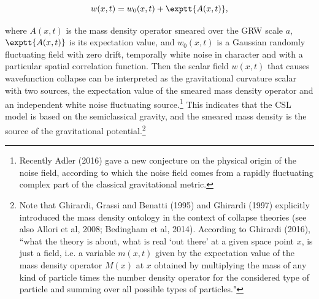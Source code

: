 \begin{equation}
w(x, t) = w_0(x, t) + \exptt{A(x, t)},
\label{}
\end{equation}

\noindent where $A(x, t)$ is the mass density operator smeared over the GRW scale $a$, $\exptt{A(x, t)}$ is its expectation value, and $w_0(x, t)$ is a Gaussian randomly fluctuating field with zero drift, temporally white noise in character and with a particular spatial correlation function. Then the scalar field $w(x, t)$ that causes wavefunction collapse can be interpreted as the gravitational curvature scalar with two sources, the expectation value of the smeared mass density operator and an independent white noise fluctuating source.\footnote{Recently Adler (2016) gave a new conjecture on the physical origin of the noise field, according to which the noise field comes from a rapidly fluctuating complex part of the classical gravitational metric.} This indicates that the CSL model is based on the semiclassical gravity, and the smeared mass density is the source of the gravitational potential.\footnote{Note that Ghirardi, Grassi and Benatti (1995) and Ghirardi (1997) explicitly introduced the mass density ontology in the context of collapse theories (see also Allori et al, 2008; Bedingham et al, 2014). According to Ghirardi (2016), ``what the theory is about, what is real `out there' at a given space point $x$, is just a field, i.e. a variable $m(x,t)$ given by the expectation value of the mass density operator $M(x)$ at $x$ obtained by multiplying the mass of any kind of particle times the number density operator for the considered type of particle and summing over all possible types of particles."}

